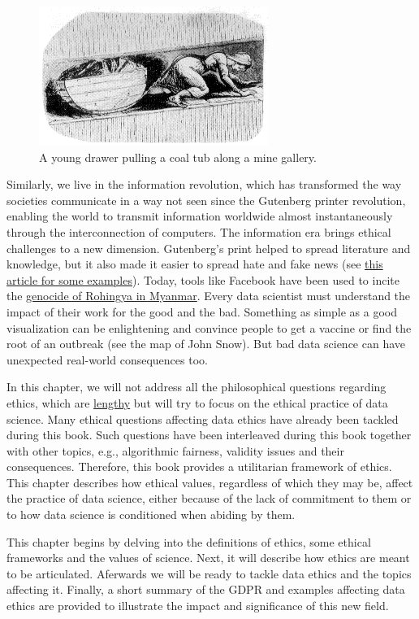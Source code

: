\documentclass[
]{book}
\begin{document}
\begin{figure}

{\centering \includegraphics[width=0.25\linewidth]{Figures/coaltub} 

}

\caption{A young drawer pulling a coal tub along a mine gallery.}\label{fig:coaltub}
\end{figure}

Similarly, we live in the information revolution, which has transformed the way societies communicate in a way not seen since the Gutenberg printer revolution, enabling the world to transmit information worldwide almost instantaneously through the interconnection of computers. The information era brings ethical challenges to a new dimension. Gutenberg's print helped to spread literature and knowledge, but it also made it easier to spread hate and fake news (see \href{https://www.politico.com/magazine/story/2016/12/fake-news-history-long-violent-214535/}{this article for some examples}). Today, tools like Facebook have been used to incite the \href{https://www.nytimes.com/2018/10/15/technology/myanmar-facebook-genocide.html}{genocide of Rohingya in Myanmar}. Every data scientist must understand the impact of their work for the good and the bad. Something as simple as a good visualization can be enlightening and convince people to get a vaccine or find the root of an outbreak (see the map of John Snow). But bad data science can have unexpected real-world consequences too.

In this chapter, we will not address all the philosophical questions regarding ethics, which are \href{https://en.wikipedia.org/wiki/Ethics}{lengthy} but will try to focus on the ethical practice of data science. Many ethical questions affecting data ethics have already been tackled during this book. Such questions have been interleaved during this book together with other topics, e.g., algorithmic fairness, validity issues and their consequences. Therefore, this book provides a utilitarian framework of ethics. This chapter describes how ethical values, regardless of which they may be, affect the practice of data science, either because of the lack of commitment to them or to how data science is conditioned when abiding by them.

This chapter begins by delving into the definitions of ethics, some ethical frameworks and the values of science. Next, it will describe how ethics are meant to be articulated. Aferwards we will be ready to tackle data ethics and the topics affecting it. Finally, a short summary of the GDPR and examples affecting data ethics are provided to illustrate the impact and significance of this new field.
\end{document}
